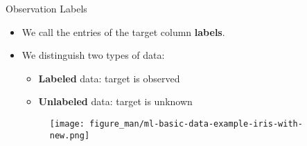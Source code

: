 \documentclass[11pt,compress,t,notes=noshow, xcolor=table]{beamer}
\begin{document}
\begin{vbframe}{Observation Labels}

\begin{itemize}

  \item We call the entries of the target column \textbf{labels}.
  \item We distinguish two types of data:
  
  \begin{itemize}
  
      \item \textbf{Labeled} data: target is observed
    
    \item \textbf{Unlabeled} data:  target is unknown
  
  \end{itemize}
  
  
  
  \begin{figure}
    \texttt{[image: figure\_man/ml-basic-data-example-iris-with-new.png]} 
  \end{figure}

\end{itemize}

\end{vbframe}

\end{document}
